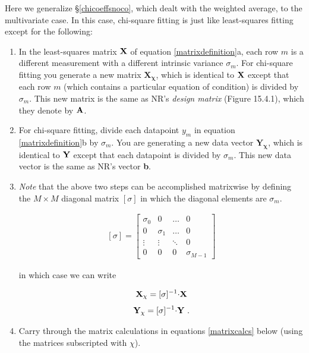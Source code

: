 \documentclass[psfig,preprint]{aastex}
\begin{document}
	Here we generalize \S \ref{chicoeffsnoco}, which dealt with the
weighted average, to the multivariate case.  In this case, chi-square
fitting is just like least-squares fitting except for the following:
\begin{enumerate}

	\item In the least-squares matrix $\bf X$ of equation
\ref{matrixdefinition}a, each row $m$ is a different measurement with a
different intrinsic variance $\sigma_{m}$.  For chi-square fitting you
generate a new matrix $\mathbf {X_\chi}$, which is identical to ${\bf
X}$ except that each row $m$ (which contains a particular equation of
condition) is divided by $\sigma_{m}$.  This new matrix is the same as
NR's {\it design matrix} (Figure 15.4.1), which they denote by $\bf A$. 

	\item For chi-square fitting, divide each datapoint $y_m$ in
equation \ref{matrixdefinition}b by $\sigma_{m}$.  You are generating a
new data vector $\mathbf {Y_\chi}$, which is identical to ${\bf Y}$
except that each datapoint is divided by $\sigma_{m}$.  This new data
vector is the same as NR's vector {\bf b}. 

	\item {\it Note} that the above two steps can be accomplished
matrixwise by defining the $M \times M$ diagonal matrix $[\sigma]$ in
which the diagonal elements are $\sigma_m$.  

\begin{eqnarray} \label{diagsigma}
[\sigma] = 
\left[ 
\begin{array}{cccc}  
\sigma_0 & 0 &  {\dots} & 0 \\  
0  & \sigma_1 &  {\dots} & 0 \\  
\vdots & \vdots &  \ddots & 0 \\
0 & 0 & 0 &  \sigma_{M-1}
\end{array}
\right]
\end{eqnarray} 

\noindent in which case we can write

\begin{mathletters}
\begin{equation}
{\bf X_\chi} = [\sigma]^{-1} {\bf \cdot X}
\end{equation}
\begin{equation}
{\bf Y_\chi} =  [\sigma]^{-1} {\bf \cdot Y} \ .
\end{equation}
\end{mathletters}

	\item Carry through the matrix calculations in equations
\ref{matrixcalcs} below (using the matrices subscripted with
$\chi$).

\end{enumerate}
\end{document}
